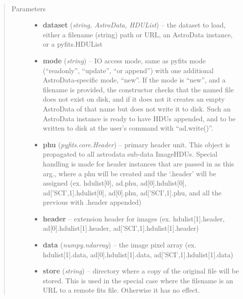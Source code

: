 \documentclass[letterpaper,10pt,english]{sphinxmanual}
\begin{document}
\begin{fulllineitems}
\label{chapter_AstroDataClass:astrodata.data.AstroData.__init__}~\begin{quote}\begin{description}
\item[{Parameters}] \leavevmode\begin{itemize}
\item {} 
\textbf{dataset} (\emph{string, AstroData, HDUList}) -- the dataset to load, either a filename (string) path
or URL, an
AstroData instance, or a pyfits.HDUList

\item {} 
\textbf{mode} (\emph{string}) -- IO access mode, same as pyfits mode (``readonly'', ``update'',
``or append'') with one additional AstroData-specific mode, ``new''.
If the mode is ``new'', and a filename is provided, the constructor
checks that the named file does not exist on disk,
and if it does not it creates an empty AstroData of that name 
but does not write it to disk. Such an AstroData 
instance is ready to have HDUs appended, and to be written to disk
at the user's command with ``ad.write()''.

\item {} 
\textbf{phu} (\emph{pyfits.core.Header}) -- primary header unit. This object is propagated to all 
astrodata sub-data ImageHDUs. Special handling is made for header
instances that are passed in as this arg., where a phu will be 
created and the `.header' will be assigned (ex. hdulist{[}0{]}, ad.phu,
ad{[}0{]}.hdulist{[}0{]}, ad{[}'SCI',1{]}.hdulist{[}0{]}, ad{[}0{]}.phu, 
ad{[}'SCI',1{]}.phu, and all the previous with .header appended)

\item {} 
\textbf{header} -- extension header for images (ex. hdulist{[}1{]}.header,
ad{[}0{]}.hdulist{[}1{]}.header, ad{[}'SCI',1{]}.hdulist{[}1{]}.header)

\item {} 
\textbf{data} (\emph{numpy.ndarray}) -- the image pixel array (ex. hdulist{[}1{]}.data,
ad{[}0{]}.hdulist{[}1{]}.data, ad{[}'SCI',1{]}.hdulist{[}1{]}.data)

\item {} 
\textbf{store} (\emph{string}) -- directory where a copy of the original file will be 
stored.  This is used in the special case where the
filename is an URL to a remote fits file.  Otherwise it has
no effect.


\end{itemize}
\end{description}
\end{quote}
\end{fulllineitems}
\end{document}
